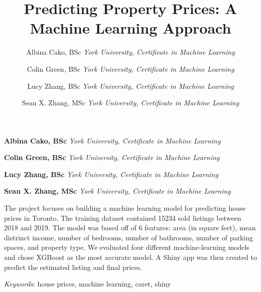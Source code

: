 \documentclass[11pt,]{article}
\title{Predicting Property Prices: A Machine Learning Approach  }
\author{\Large Albina Cako, BSc\vspace{0.05in} \newline\normalsize\emph{York University, Certificate in Machine Learning}   \and \Large Colin Green, BSc\vspace{0.05in} \newline\normalsize\emph{York University, Certificate in Machine Learning}   \and \Large Lucy Zhang, BSc\vspace{0.05in} \newline\normalsize\emph{York University, Certificate in Machine Learning}   \and \Large Sean X. Zhang, MSc\vspace{0.05in} \newline\normalsize\emph{York University, Certificate in Machine Learning}  }
\date{}
\newcommand*{\authorfont}{\fontfamily{phv}\selectfont}
\renewenvironment{abstract}
 {{%
    \setlength{\leftmargin}{0mm}
    \setlength{\rightmargin}{\leftmargin}%
  }%
  \relax}
 {\endlist}
\begin{document}
	
%

{%
\setlength{\parindent}{0pt}
\thispagestyle{plain}
{\fontsize{18}{20}\selectfont\raggedright 
\maketitle  %

}

{
   \vskip 13.5pt\relax \normalsize\fontsize{11}{12} 
\textbf{\authorfont Albina Cako, BSc} \hskip 15pt \emph{\small York University, Certificate in Machine Learning}   \par \textbf{\authorfont Colin Green, BSc} \hskip 15pt \emph{\small York University, Certificate in Machine Learning}   \par \textbf{\authorfont Lucy Zhang, BSc} \hskip 15pt \emph{\small York University, Certificate in Machine Learning}   \par \textbf{\authorfont Sean X. Zhang, MSc} \hskip 15pt \emph{\small York University, Certificate in Machine Learning}   

}

}








\begin{abstract}

    \hbox{\vrule height .2pt width 39.14pc}

    \vskip 8.5pt %

\noindent The project focuses on building a machine learning model for predicting
house prices in Toronto. The training dataset contained 15234 sold
listings between 2018 and 2019. The model was based off of 6 features:
area (in square feet), mean distrinct income, number of bedrooms, number
of bathrooms, number of parking spaces, and property type. We evaluated
four different machine-learning models and chose XGBoost as the most
accurate model. A Shiny app was then created to predict the estimated
listing and final prices.


\vskip 8.5pt \noindent \emph{Keywords}: house prices, machine learning, caret, shiny \par

    \hbox{\vrule height .2pt width 39.14pc}



\end{abstract}
\end{document}
